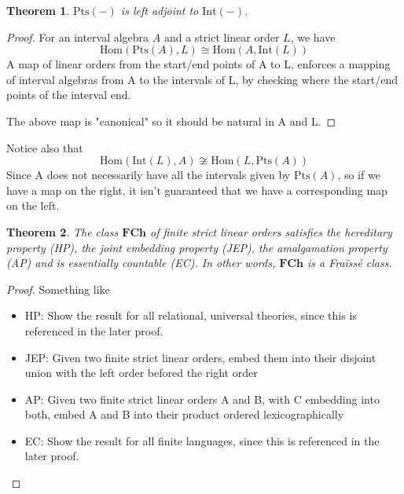 \documentclass[11pt %
              ]{article}
\newcommand{\finslo}{\textbf{FCh}}
\newcommand{\inter}[1][-]{\text{Int}\left(#1\right)}
\newcommand{\points}[1][-]{\text{Pts}\left(#1\right)}
\theoremstyle{plain}
\newtheorem{thm}{Theorem}%
\theoremstyle{definition}
\theoremstyle{remark}
\begin{document}
\begin{thm}
  $\points$ is left adjoint to $\inter$.
\end{thm}
\begin{proof}
  For an interval algebra $A$ and a strict linear order $L$, we have
  \begin{equation*}
    \text{Hom}(\points[A], L) \cong \text{Hom}(A, \inter[L])
  \end{equation*}
  A map of linear orders from the start/end points of A to L, enforces a mapping of interval
  algebras from A to the intervals of L, by checking where the start/end points of the interval end.

  The above map is "canonical" so it should be natural in A and L.
\end{proof}

Notice also that
\begin{equation*}
  \text{Hom}(\inter[L],A) \not\cong \text{Hom}(L, \points[A])
\end{equation*}
Since A does not necessarily have all the intervals given by $\points[A]$, so if we have a map on
the right, it isn't guaranteed that we have a corresponding map on the left.




\begin{thm}
  The class $\finslo$ of finite strict linear orders satisfies the hereditary property (HP),
  the joint embedding property (JEP), the amalgamation property (AP) and is essentially countable
  (EC). In other words, $\finslo$ is a Fraïssé class.
\end{thm}
\begin{proof}
  Something like
  \begin{itemize}
    \item HP: Show the result for all relational, universal theories, since this is referenced in
      the later proof.
    \item JEP: Given two finite strict linear orders, embed them into their disjoint union with
      the left order befored the right order
    \item AP: Given two finite strict linear orders A and B, with C embedding into both,
      embed A and B into their product ordered lexicographically
    \item EC: Show the result for all finite languages, since this is referenced in the later proof.
  \end{itemize}
\end{proof}
\end{document}
